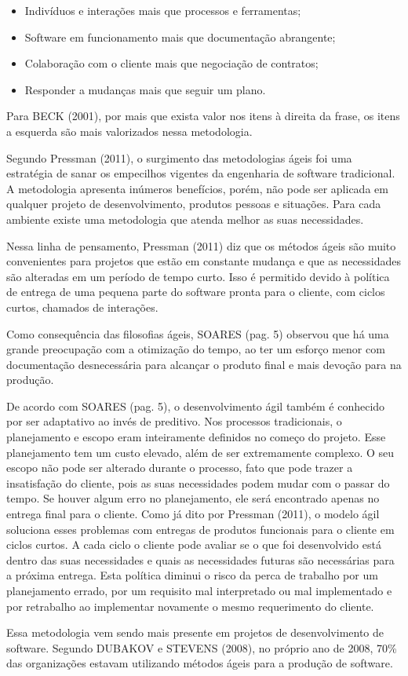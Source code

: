 \begin{itemize}
    \item Indivíduos e interações mais que processos e ferramentas;
    \item Software em funcionamento mais que documentação abrangente;
    \item Colaboração com o cliente mais que negociação de contratos;
    \item Responder a mudanças mais que seguir um plano.
\end{itemize}

Para BECK (2001), por mais que exista valor nos itens à direita da frase, os itens a esquerda são mais valorizados nessa metodologia.

Segundo Pressman (2011), o surgimento das metodologias ágeis foi uma estratégia de sanar os empecilhos vigentes da engenharia de software tradicional. A metodologia apresenta inúmeros benefícios, porém, não pode ser aplicada em qualquer projeto de desenvolvimento, produtos pessoas e situações. Para cada ambiente existe uma metodologia que atenda melhor as suas necessidades.

Nessa linha de pensamento, Pressman (2011) diz que os métodos ágeis são muito convenientes para projetos que estão em constante mudança e que as necessidades são alteradas em um período de tempo curto. Isso é permitido devido à política de entrega de uma pequena parte do software pronta para o cliente, com ciclos curtos, chamados de interações.

Como consequência das filosofias ágeis, SOARES (pag. 5) observou que há uma grande preocupação com a otimização do tempo, ao ter um esforço menor com documentação desnecessária para alcançar o produto final e mais devoção para na produção.

De acordo com SOARES (pag. 5), o desenvolvimento ágil também é conhecido por ser adaptativo ao invés de preditivo. Nos processos tradicionais, o planejamento e escopo eram inteiramente definidos no começo do projeto. Esse planejamento tem um custo elevado, além de ser extremamente complexo. O seu escopo não pode ser alterado durante o processo, fato que pode trazer a insatisfação do cliente, pois as suas necessidades podem mudar com o passar do tempo. Se houver algum erro no planejamento, ele será encontrado apenas no entrega final para o cliente. Como já dito por Pressman (2011), o modelo ágil soluciona esses problemas com entregas de produtos funcionais para o cliente em ciclos curtos. A cada ciclo o cliente pode avaliar se o que foi desenvolvido está dentro das suas necessidades e quais as necessidades futuras são necessárias para a próxima entrega. Esta política diminui o risco da perca de trabalho por um planejamento errado, por um requisito mal interpretado ou mal implementado e por retrabalho ao implementar novamente o mesmo requerimento do cliente.

Essa metodologia vem sendo mais presente em projetos de desenvolvimento de software. Segundo DUBAKOV e STEVENS (2008), no próprio ano de 2008, 70\% das organizações estavam utilizando métodos ágeis para a produção de software.
